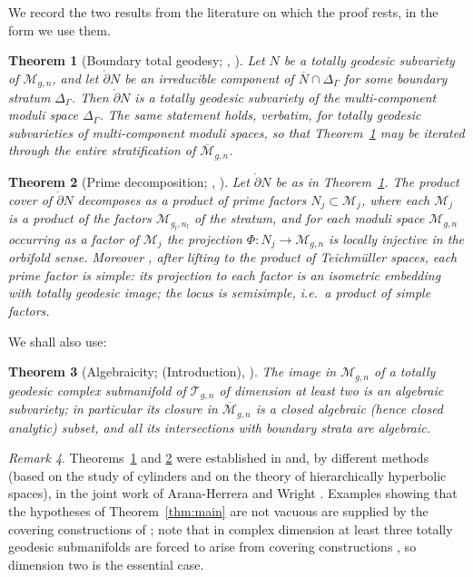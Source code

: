\documentclass[11pt]{amsart}
\newtheorem{theorem}{Theorem}
\theoremstyle{definition}
\theoremstyle{remark}
\newtheorem{remark}[theorem]{Remark}
\newcommand{\M}{\mathcal{M}}
\newcommand{\T}{\mathcal{T}}
\begin{document}
We record the two results from the literature on which the proof rests, in
the form we use them.

\begin{theorem}[{Boundary total geodesy; \cite[Thm.~1.4]{Boundary},
\cite[Thm.~3.9]{AW}}]\label{thm:A}
Let $N$ be a totally geodesic subvariety of $\M_{g,n}$, and let
$\mathring{\partial}N$ be an irreducible component of
$\overline N\cap\Delta_\Gamma$ for some boundary stratum $\Delta_\Gamma$.
Then $\mathring{\partial}N$ is a totally geodesic subvariety of the
multi-component moduli space $\Delta_\Gamma$. The same statement holds,
verbatim, for totally geodesic subvarieties of multi-component moduli
spaces, so that Theorem~\ref{thm:A} may be iterated through the entire
stratification of $\overline{\M}_{g,n}$.
\end{theorem}

\begin{theorem}[{Prime decomposition; \cite[Thm.~1.7]{Boundary},
\cite[Thm.~1.3]{AW}}]\label{thm:B}
Let $\mathring{\partial}N$ be as in Theorem~\ref{thm:A}. The product cover of
$\mathring{\partial}N$ decomposes as a product of prime factors
$N_j\subset\mathcal{M}_j$, where each $\mathcal{M}_j$ is a product of the
factors $\M_{g_l,n_l}$ of the stratum, and for each moduli space
$\M_{g,n}$ occurring as a factor of $\mathcal{M}_j$ the projection
$\Phi:N_j\to \M_{g,n}$ is locally injective in the orbifold sense. Moreover
\cite[Thm.~1.3]{AW}, after lifting to the product of Teichm\"uller spaces,
each prime factor is \emph{simple}: its projection to each factor is an
isometric embedding with totally geodesic image; the locus is
\emph{semisimple}, i.e.\ a product of simple factors.
\end{theorem}

We shall also use:

\begin{theorem}[{Algebraicity; \cite{AW} (Introduction),
\cite{TGSub}}]\label{thm:alg}
The image in $\M_{g,n}$ of a totally geodesic complex submanifold of
$\T_{g,n}$ of dimension at least two is an algebraic subvariety; in
particular its closure in $\overline{\M}_{g,n}$ is a closed algebraic (hence
closed analytic) subset, and all its intersections with boundary strata are
algebraic.
\end{theorem}

\begin{remark}
Theorems~\ref{thm:A} and \ref{thm:B} were established in \cite{Boundary}
and, by different methods (based on the study of cylinders and on the theory
of hierarchically hyperbolic spaces), in the joint work of Arana-Herrera and
Wright \cite{AW}. Examples showing that the hypotheses of
Theorem~\ref{thm:main} are not vacuous are supplied by the covering
constructions of \cite{Cubic}; note that in complex dimension at least three
totally geodesic submanifolds are forced to arise from covering
constructions \cite{ThreeD}, so dimension two is the essential case.
\end{remark}
\end{document}
